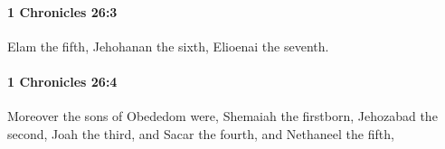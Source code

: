 		\paragraph{1 Chronicles 26:3} %
			\label{1CHRONICLES-26-3}

			Elam the fifth, Jehohanan the sixth, Elioenai the seventh.


		\paragraph{1 Chronicles 26:4} %
			\label{1CHRONICLES-26-4}

			Moreover the sons of Obededom were, Shemaiah the firstborn, Jehozabad the second, Joah the third, and Sacar the fourth, and Nethaneel the fifth,


